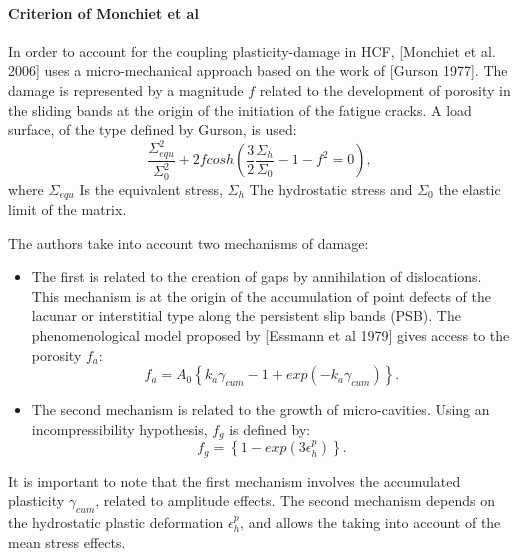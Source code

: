 \documentclass[3p,times,procedia,number]{elsarticle}
\begin{document}
\paragraph{Criterion of Monchiet et al}
In order to account for the coupling plasticity-damage in HCF, [Monchiet et al. 2006]\cite{monchiet2006contributions} uses a micro-mechanical approach based on the work of [Gurson 1977]\cite{gurson1977continuum}. The damage is represented by a magnitude $f$ related to the development of porosity in the sliding bands at the origin of the initiation of the fatigue cracks. A load surface, of the type defined by Gurson, is used:
\begin{equation}
\dfrac{\Sigma_{equ}^2}{\Sigma_0^2}+2fcosh\left(\dfrac{3}{2}\dfrac{\Sigma_h}{\Sigma_0}-1-f^2=0 \right),
\label{eq.monchiet1}
\end{equation}
where $\Sigma_{equ}$ Is the equivalent stress, $\Sigma_h$ The hydrostatic stress and $\Sigma_0$ the elastic limit of the matrix.

The authors take into account two mechanisms of damage:

\vspace{6pt}
\begin{itemize}
	\item  The first is related to the creation of gaps by annihilation of dislocations. This mechanism is at the origin of the accumulation of point defects of the lacunar or interstitial type along the persistent slip bands (PSB). The phenomenological model proposed by [Essmann et al 1979]\cite{doi:10.1080/01418618108239541} gives access to the porosity $f_a$:
\begin{equation}
f_a= A_0\left\lbrace k_a\gamma_{cum}-1+exp\left(-k_a\gamma_{cum} \right)  \right\rbrace .
\label{eq.monchiet2}
\end{equation}

	\item  The second mechanism is related to the growth of micro-cavities. Using an incompressibility hypothesis, $f_g$ is defined by:
\begin{equation}
f_g=\left\lbrace 1-exp\left(3\epsilon_h^p \right) \right\rbrace.
\label{eq.monchiet3}
\end{equation}
\end{itemize}

	It is important to note that the first mechanism involves the accumulated plasticity $\gamma_{cum}$, related to amplitude effects. The second mechanism depends on the hydrostatic plastic deformation $\epsilon_h^p$, and allows the taking into account of the mean stress effects.
	
\end{document}
